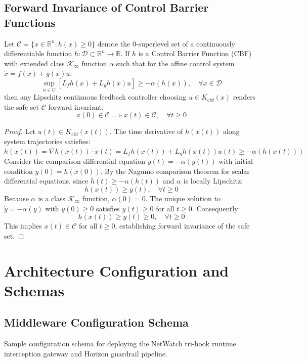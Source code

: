 \section{Forward Invariance of Control Barrier Functions}
\label{app:proof_cbf}

\begin{theorem}
Let $\mathcal{C} = \{x \in \mathbb{R}^n : h(x) \ge 0\}$ denote the 0-superlevel set of a continuously differentiable function $h: \mathcal{D} \subset \mathbb{R}^n \to \mathbb{R}$. If $h$ is a Control Barrier Function (CBF) with extended class $\mathcal{K}_\infty$ function $\alpha$ such that for the affine control system $\dot{x} = f(x) + g(x)u$:
\begin{equation}
    \sup_{u \in U} \left[ L_f h(x) + L_g h(x) u \right] \ge -\alpha(h(x)), \quad \forall x \in \mathcal{D}
\end{equation}
then any Lipschitz continuous feedback controller choosing $u \in K_{\mathrm{cbf}}(x)$ renders the safe set $\mathcal{C}$ forward invariant:
\begin{equation}
    x(0) \in \mathcal{C} \implies x(t) \in \mathcal{C}, \quad \forall t \ge 0
\end{equation}
\end{theorem}

\begin{proof}
Let $u(t) \in K_{\mathrm{cbf}}(x(t))$. The time derivative of $h(x(t))$ along system trajectories satisfies:
\begin{equation}
    \dot{h}(x(t)) = \nabla h(x(t)) \cdot \dot{x}(t) = L_f h(x(t)) + L_g h(x(t)) u(t) \ge -\alpha(h(x(t)))
\end{equation}
Consider the comparison differential equation $\dot{y}(t) = -\alpha(y(t))$ with initial condition $y(0) = h(x(0))$.
By the Nagumo comparison theorem for scalar differential equations, since $\dot{h}(t) \ge -\alpha(h(t))$ and $\alpha$ is locally Lipschitz:
\begin{equation}
    h(x(t)) \ge y(t), \quad \forall t \ge 0
\end{equation}
Because $\alpha$ is a class $\mathcal{K}_\infty$ function, $\alpha(0) = 0$. The unique solution to $\dot{y} = -\alpha(y)$ with $y(0) \ge 0$ satisfies $y(t) \ge 0$ for all $t \ge 0$. Consequently:
\begin{equation}
    h(x(t)) \ge y(t) \ge 0, \quad \forall t \ge 0
\end{equation}
This implies $x(t) \in \mathcal{C}$ for all $t \ge 0$, establishing forward invariance of the safe set.
\end{proof}

\chapter{Architecture Configuration and Schemas}
\label{app:config}

\section{Middleware Configuration Schema}
Sample configuration schema for deploying the NetWatch tri-hook runtime interception gateway and Horizon guardrail pipeline.
